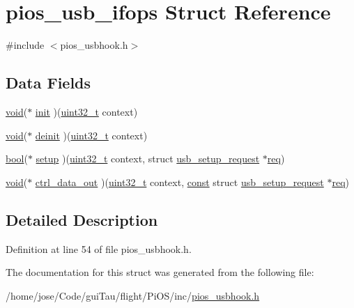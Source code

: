 \hypertarget{structpios__usb__ifops}{\section{pios\-\_\-usb\-\_\-ifops Struct Reference}
\label{structpios__usb__ifops}
}


{\ttfamily \#include $<$pios\-\_\-usbhook.\-h$>$}

\subsection*{Data Fields}
\begin{DoxyCompactItemize}
\item 
\hyperlink{group___n_a_m_e_ga18028b8badbf1ea7e704ccac3c488e82}{void}($\ast$ \hyperlink{group___p_i_o_s___u_s_b_h_o_o_k_ga08614658e728cfb81cb4091e3e210624}{init} )(\hyperlink{stdint_8h_a435d1572bf3f880d55459d9805097f62}{uint32\-\_\-t} context)
\item 
\hyperlink{group___n_a_m_e_ga18028b8badbf1ea7e704ccac3c488e82}{void}($\ast$ \hyperlink{group___p_i_o_s___u_s_b_h_o_o_k_ga23c8bc133e24838b490c81a9d47318d4}{deinit} )(\hyperlink{stdint_8h_a435d1572bf3f880d55459d9805097f62}{uint32\-\_\-t} context)
\item 
\hyperlink{group___exported__types_gaf6a258d8f3ee5206d682d799316314b1}{bool}($\ast$ \hyperlink{group___p_i_o_s___u_s_b_h_o_o_k_gafc58e776c6ff79a3974ca6dc1decf467}{setup} )(\hyperlink{stdint_8h_a435d1572bf3f880d55459d9805097f62}{uint32\-\_\-t} context, struct \hyperlink{structusb__setup__request}{usb\-\_\-setup\-\_\-request} $\ast$\hyperlink{pios__opahrs__proto_8h_ad651fd9affe5ed0ac9abccd8e2791a2c}{req})
\item 
\hyperlink{group___n_a_m_e_ga18028b8badbf1ea7e704ccac3c488e82}{void}($\ast$ \hyperlink{group___p_i_o_s___u_s_b_h_o_o_k_ga7fce932d233ec743f190170b5b277746}{ctrl\-\_\-data\-\_\-out} )(\hyperlink{stdint_8h_a435d1572bf3f880d55459d9805097f62}{uint32\-\_\-t} context, \hyperlink{group___n_a_m_e_ga7ae6d0e43244213b34de2c2b9aa30da6}{const} struct \hyperlink{structusb__setup__request}{usb\-\_\-setup\-\_\-request} $\ast$\hyperlink{pios__opahrs__proto_8h_ad651fd9affe5ed0ac9abccd8e2791a2c}{req})
\end{DoxyCompactItemize}


\subsection{Detailed Description}


Definition at line 54 of file pios\-\_\-usbhook.\-h.



The documentation for this struct was generated from the following file\-:\begin{DoxyCompactItemize}
\item 
/home/jose/\-Code/gui\-Tau/flight/\-Pi\-O\-S/inc/\hyperlink{pios__usbhook_8h}{pios\-\_\-usbhook.\-h}\end{DoxyCompactItemize}
